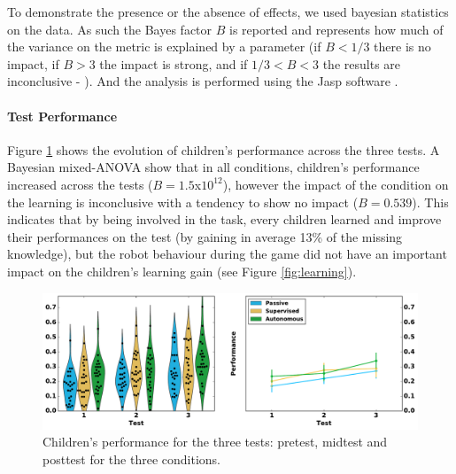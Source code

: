 To demonstrate the presence or the absence of effects, we used bayesian statistics on the data. As such the Bayes factor $B$ is reported and represents how much of the variance on the metric is explained by a parameter (if $B < 1/3$ there is no impact, if $B > 3$ the impact is strong, and if $1/3<B<3$ the results are inconclusive - \cite{jeffreys1998theory,dienes2011bayesian}). And the analysis is performed using the Jasp software \cite{jasp2018}.



\paragraph{Test Performance}

Figure \ref{fig:performance} shows the evolution of children's performance across the three tests. A Bayesian mixed-ANOVA show that in all conditions, children's performance increased across the tests ($B=1.5$x$10^{12}$), however the impact of the condition on the learning is inconclusive with a tendency to show no impact ($B=0.539$). This indicates that by being involved in the task, every children learned and improve their performances on the test (by gaining in average 13\% of the missing knowledge), but the robot behaviour during the game did not have an important impact on the children's learning gain (see Figure \ref{fig:learning}).

\begin{figure}[ht]
	\includegraphics[width=1\linewidth]{perf.pdf}
	\centering
	\caption{Children's performance for the three tests: pretest, midtest and posttest for the three conditions.}
	\label{fig:performance}
\end{figure}

